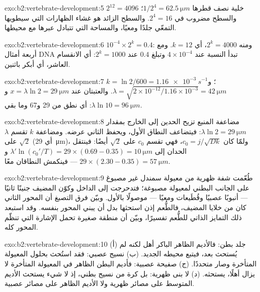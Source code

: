 \begin{solution}{exo:b2:vertebrate-development:5}
$2^{12} = 4096$ خلية نصف قطرها $1/2^{4} = \qty{62.5}{\micro m}$؛
والسطح مضروب في $2^{4} = 16$. والسطح الزائد هو
غشاء الظهارات التي سيطويها التمعّي جلدًا
ومعيًا، والمساحة التي تتبادل عبرها  مع
محيطها.
\end{solution}

\begin{solution}{exo:b2:vertebrate-development:6}
$10^{-4}\times 2^{k} = 0.4$: ومنه $2^{k} = 4000$، أي $k = 12$. ومع أربعة
أمثال DNA تبدأ النسبة عند $4\times 10^{-4}$ وتبلغ $0.4$
عند $2^{k} = 1000$: أي الانقسام العاشر، أي أبكر باثنين.
\end{solution}

\begin{solution}{exo:b2:vertebrate-development:7}
$k = \ln 2/600 = \qty{1.16e-3}{s^{-1}}$؛ و$\lambda = \sqrt{2\times
10^{-12}/1.16\times 10^{-3}} = \qty{42}{\micro m}$. والعتبتان عند
$x = \lambda\ln 2 = \qty{29}{\micro m}$ و$\lambda\ln 10 =
\qty{96}{\micro m}$: أي نطق من 29 و67 وما بقي.
\end{solution}

\begin{solution}{exo:b2:vertebrate-development:8}
مضاعفة المنبع تزيح الحدين إلى الخارج بمقدار $\lambda\ln
2 = \qty{29}{\micro m}$: فيتضاعف النطاق الأول، ويحفظ الثاني
عرضه. ومضاعفة $k$ تقسم $\lambda$ على $\sqrt 2$
(أي \qty{29}{\micro m})، ولمّا كان $c_0 = j/\sqrt{Dk}$، فهي تقسم $c_0$ على
$\sqrt 2$ أيضًا: فينتقل الحدان إلى $\lambda'\ln(c_0'/T) =
29\times(0.69 - 0.35) = \qty{10}{\micro m}$ و$29\times(2.30 -
0.35) = \qty{57}{\micro m}$ --- فينكمش النطاقان معًا.
\end{solution}

\begin{solution}{exo:b2:vertebrate-development:9}
طُعّمت شفة ظهرية من معيولة سمندل غير مصبوغ على
الجانب البطني لمعيولة مصبوغة؛ فتدحرجت إلى الداخل وكوّن المضيف
جنينًا ثانيًا --- أنبوبًا عصبيًا وقُطَيعات ومعيًا --- موصولًا بالأول.
وبيّن فرق التصبغ أن المحور الثاني كان من خلايا المضيف،
فالطُّعم إذن استحثها بدل أن يبني المحور
بنفسه. وقد استبعد ذلك التمايز الذاتي للطُّعم تفسيرًا،
وبيّن أن منطقة صغيرة تحمل الإشارة التي
تنظّم المحور كله.
\end{solution}

\begin{solution}{exo:b2:vertebrate-development:10}
(أ) جلد بطن: فالأديم الظاهر الباكر أهل لكنه لم يُستحث بعد،
فيتبع محيطه الجديد. (ب) نسيج عصبي: فقد استُحث
بحلول المعيولة المتأخرة وصار متحددًا. (ج) صفيحة عصبية:
فأديم البطن الظاهر في المعيولة المتأخرة لا يزال أهلًا، 
يستحثه. (د) لا بنى ظهرية: بل كرة من نسيج بطني، إذ
لا شيء يستحث الأديم المتوسط على مصائر ظهرية ولا الأديم الظاهر على
مصائر عصبية.
\end{solution}

